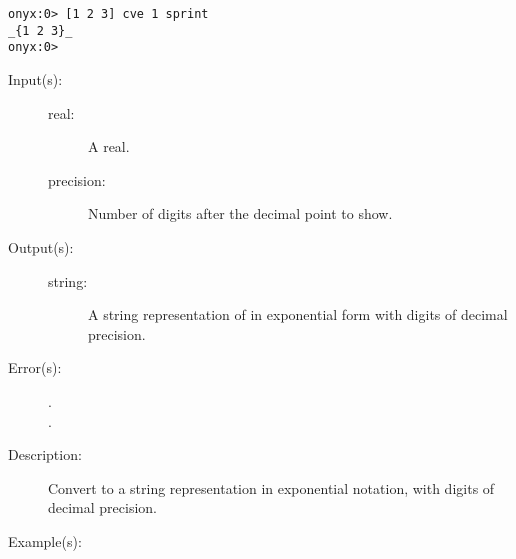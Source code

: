 \begin{description}
\begin{description}
\begin{verbatim}
onyx:0> [1 2 3] cve 1 sprint
_{1 2 3}_
onyx:0>
		\end{verbatim}
	\end{description}
\label{systemdict:cves}
\item[{\onyxop{real precision}{cves}{string}}: ]
	\begin{description}\item[]
	\item[Input(s): ]
		\begin{description}\item[]
		\item[real: ]
			A real.
		\item[precision: ]
			Number of digits after the decimal point to show.
		\end{description}
	\item[Output(s): ]
		\begin{description}\item[]
		\item[string: ]
			A string representation of  in exponential
			form with  digits of decimal precision.
		\end{description}
	\item[Error(s): ]
		\begin{description}\item[]
		\item[.]
		\item[.]
		\end{description}
	\item[Description: ]
		Convert  to a string representation in exponential
		notation, with  digits of decimal precision.
	\item[Example(s): ]\begin{verbatim}


\end{verbatim}
\end{description}
\end{description}
